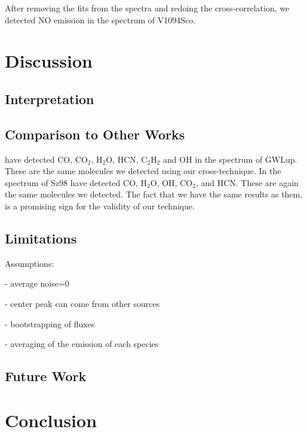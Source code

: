 \documentclass[twoside, single, authoryear, semicolon]{lion-msc}
\newcommand{\4}{$_4$}
\newcommand{\3}{$_3$}
\newcommand{\2}{$_2$}
\begin{document}
After removing the fits from the spectra and redoing the cross-correlation, we detected NO emission in the spectrum of V1094Sco.

\chapter{Discussion}\label{Ch: Discussion}
\section{Interpretation}
\section{Comparison to Other Works}
\cite{Grant_2023} have detected CO, CO\2, H\2O, HCN, C\2H\2 and OH in the spectrum of GWLup. These are the same molecules we detected using our cross-technique. In the spectrum of Sz98 \cite{Gasman_2023} have detected CO, H\2O, OH, CO\2, and HCN. These are again the same molecules we detected. The fact that we have the same results as them, is a promising sign for the validity of our technique. 
\section{Limitations}
Assumptions:

- average noise=0

- center peak can come from other sources

- bootstrapping of fluxes

- averaging of the emission of each species

\section{Future Work}


\chapter{Conclusion}\label{Ch: Conclusion}



\end{document}
